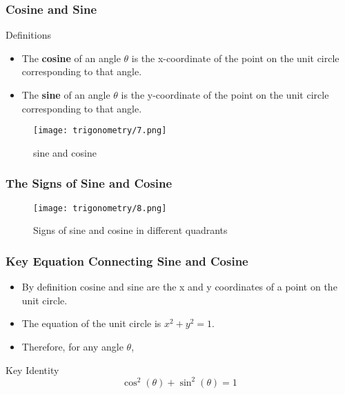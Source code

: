 \documentclass{beamer}
\begin{document}
\begin{frame}
    \frametitle{Cosine and Sine}
    \begin{block}{Definitions}
        \begin{itemize}
            \item The \textbf{cosine} of an angle $\theta$ is the x-coordinate of the point on the unit circle corresponding to that angle.
            \item The \textbf{sine} of an angle $\theta$ is the y-coordinate of the point on the unit circle corresponding to that angle.
        \end{itemize}
    \end{block}     
    \begin{figure}[h]    
        \begin{minipage}[b]{0.8\textwidth}
            \centering
            \texttt{[image: trigonometry/7.png]}
            \caption{sine and cosine}
        \end{minipage}
    \end{figure}
\end{frame}

\begin{frame}
    \frametitle{The Signs of Sine and Cosine} 
    \begin{figure}
        \centering
        \texttt{[image: trigonometry/8.png]}
        \caption{Signs of sine and cosine in different quadrants}
    \end{figure}
\end{frame}

\begin{frame}
    \frametitle{Key Equation Connecting Sine and Cosine} 
    \begin{itemize}
        \item By definition cosine and sine are the x and y coordinates of a point on the unit circle.
        \item The equation of the unit circle is $x^2 + y^2 = 1$.
        \item Therefore, for any angle $\theta$,
    \end{itemize}
    \begin{block}{Key Identity}
        \[\cos^2(\theta) + \sin^2(\theta) = 1\]
    \end{block}
\end{frame}
\end{document}
